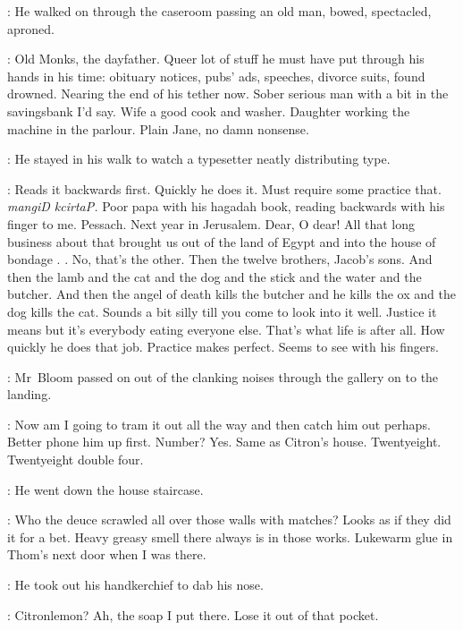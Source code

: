 
:
He walked on through the caseroom
passing an old man, bowed, spectacled, aproned.

\BloomInt:
Old Monks, the dayfather.
Queer lot of stuff he must have put through his hands in his time:
obituary notices, pubs' ads, speeches, divorce suits, found drowned.
Nearing the end of his tether now.
Sober serious man with a bit in the savingsbank I'd say.
Wife a good cook and washer.
Daughter working the machine in the parlour.
Plain Jane, no damn nonsense.



:
He stayed in his walk to watch a typesetter
neatly distributing type.

\BloomInt:
Reads it backwards first.
Quickly he does it.
Must require some practice that.
\emph{mangiD kcirtaP.}
Poor papa with his hagadah book,
reading backwards with his finger to me.
Pessach.
Next year in Jerusalem.
Dear, O dear!
All that long business about that brought us out of the land of Egypt
and into the house of bondage .
.
No, that's the other.
Then the twelve brothers, Jacob's sons.
And then the lamb and the cat and the dog
and the stick and the water and the butcher.
And then the angel of death kills the butcher
and he kills the ox and the dog kills the cat.
Sounds a bit silly till you come to look into it well.
Justice it means
but it's everybody eating everyone else.
That's what life is after all.
How quickly he does that job.
Practice makes perfect.
Seems to see with his fingers.

:
Mr~Bloom passed on out of the clanking noises
through the gallery on to the landing.

\BloomInt:
Now am I going to tram it out all the way and then catch him out perhaps.
Better phone him up first.
Number?
Yes.
Same as Citron's house.
Twentyeight.
Twentyeight double four.



:
He went down the house staircase.

\BloomInt:
Who the deuce scrawled all over those walls with matches?
Looks as if they did it for a bet.
Heavy greasy smell there always is in those works.
Lukewarm glue in Thom's next door when I was there.

:
He took out his handkerchief to dab his nose.

\BloomInt:
Citronlemon?
Ah, the soap I put there.
Lose it out of that pocket.

